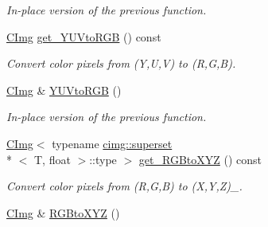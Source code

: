 \begin{DoxyCompactItemize}
\begin{DoxyCompactList}\small\item\em In-\/place version of the previous function. \end{DoxyCompactList}\item 
\hypertarget{structcimg__library_1_1_c_img_a6d1ddd191b37dd3c3f08f39b28df98e9}{\hyperlink{structcimg__library_1_1_c_img}{C\-Img} \hyperlink{structcimg__library_1_1_c_img_a6d1ddd191b37dd3c3f08f39b28df98e9}{get\-\_\-\-Y\-U\-Vto\-R\-G\-B} () const }\label{structcimg__library_1_1_c_img_a6d1ddd191b37dd3c3f08f39b28df98e9}

\begin{DoxyCompactList}\small\item\em Convert color pixels from (Y,U,V) to (R,G,B). \end{DoxyCompactList}\item 
\hypertarget{structcimg__library_1_1_c_img_a98cd009f19e7d2afc9f8ae44a3fff079}{\hyperlink{structcimg__library_1_1_c_img}{C\-Img} \& \hyperlink{structcimg__library_1_1_c_img_a98cd009f19e7d2afc9f8ae44a3fff079}{Y\-U\-Vto\-R\-G\-B} ()}\label{structcimg__library_1_1_c_img_a98cd009f19e7d2afc9f8ae44a3fff079}

\begin{DoxyCompactList}\small\item\em In-\/place version of the previous function. \end{DoxyCompactList}\item 
\hypertarget{structcimg__library_1_1_c_img_a75682264ad3b56e986714ba4a3d59dfd}{\hyperlink{structcimg__library_1_1_c_img}{C\-Img}$<$ typename \hyperlink{structcimg__library_1_1cimg_1_1superset}{cimg\-::superset}\\*
$<$ T, float $>$\-::type $>$ \hyperlink{structcimg__library_1_1_c_img_a75682264ad3b56e986714ba4a3d59dfd}{get\-\_\-\-R\-G\-Bto\-X\-Y\-Z} () const }\label{structcimg__library_1_1_c_img_a75682264ad3b56e986714ba4a3d59dfd}

\begin{DoxyCompactList}\small\item\em Convert color pixels from (R,G,B) to (X,Y,Z)\-\_. \end{DoxyCompactList}\item 
\hypertarget{structcimg__library_1_1_c_img_a1abc595ceffae87a27935a3132aa3162}{\hyperlink{structcimg__library_1_1_c_img}{C\-Img} \& \hyperlink{structcimg__library_1_1_c_img_a1abc595ceffae87a27935a3132aa3162}{R\-G\-Bto\-X\-Y\-Z} ()}\label{structcimg__library_1_1_c_img_a1abc595ceffae87a27935a3132aa3162}


\end{DoxyCompactItemize}
